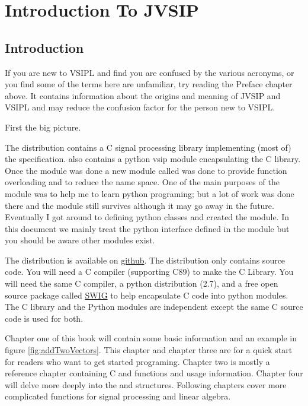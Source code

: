 \chapter{Introduction To JVSIP}
\section*{Introduction}
If you are new to VSIPL and find you are confused by the various acronyms, or you find some of the terms here are unfamiliar, try reading the Preface chapter above. It contains information about the origins and meaning of JVSIP and VSIPL and may reduce the confusion factor for the person new to VSIPL.

First the big picture.

The \jv distribution contains a C signal processing library implementing (most of) the  specification. \jv also contains a python vsip module encapsulating the C library.  Once the {} module was done a new module called {} was done to provide function overloading and to reduce the name space.  One of the main purposes of the {} module was to help me to learn python programing; but a lot of work was done there and the module still survives although it may go away in the future.  Eventually I got around to defining python classes and created the \pyjv module.  In this document we mainly treat the python interface defined in the \pyjv module but you should be aware other modules exist.

The distribution is available on \href{https://github.com/rrjudd/jvsip?}{{github}}. The distribution only contains source code. You will need a C compiler (supporting C89) to make the C Library. You will need the same C compiler, a python distribution (2.7), and a free open source package called \href{http://www.swig.org}{SWIG} to help encapsulate C code into python modules. The C library and the Python modules are independent except the same C source code is used for both.

Chapter one of this book will contain some basic information and an example in figure \ref{fig:addTwoVectors}. This chapter and chapter three are for a quick start for readers who want to get started programing. Chapter two is mostly a reference chapter containing C and \pyjv functions and usage information.  Chapter four will delve more deeply into the  and  structures.  Following chapters cover more complicated functions for signal processing and linear algebra.

